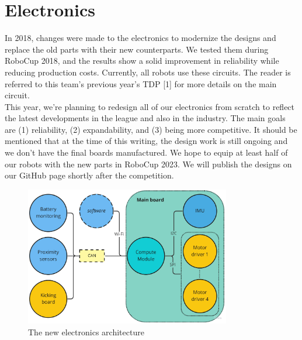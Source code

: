 \documentclass[runningheads]{llncs}
\begin{document}

\section{Electronics}

In 2018, changes were made to the electronics to modernize the designs and replace the old parts with their new counterparts. We tested them during RoboCup 2018, and the results show a solid improvement in reliability while reducing production costs. Currently, all robots use these circuits. The reader is referred to this team's previous year's TDP [1] for more details on the main circuit.\\
\indent This year, we're planning to redesign all of our electronics from scratch to reflect the latest developments in the league and also in the industry. The main goals are (1) reliability, (2) expandability, and (3) being more competitive. It should be mentioned that at the time of this writing, the design work is still ongoing and we don't have the final boards manufactured. We hope to equip at least half of our robots with the new parts in RoboCup 2023. We will publish the designs on our GitHub page shortly after the competition.

\begin{figure}
	\centering
	\includegraphics[width=0.8\textwidth]{images/electronics-architecture.jpg}
	\caption{The new electronics architecture}
	\label{fig:electronics-architecture}
\end{figure}
\end{document}
